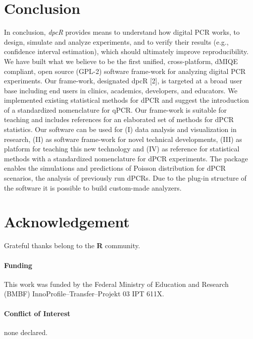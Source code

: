 \documentclass{bioinfo}
\begin{document}
%
%






\section{Conclusion}

In conclusion, \textit{dpcR} provides means to understand how digital PCR works, 
to design, simulate and analyze experiments, and to verify their results (e.g., 
confidence interval estimation), which should ultimately improve 
reproducibility. We have built what we believe to be the first unified, 
cross-platform, dMIQE compliant, open source (GPL-2) software frame-work for 
analyzing digital PCR experiments. Our frame-work, designated dpcR [2], is 
targeted at a broad user base including end users in clinics, academics, 
developers, and educators. We implemented existing statistical methods for dPCR 
and suggest the introduction of a standardized nomenclature for qPCR. Our 
frame-work is suitable for teaching and includes references for an elaborated 
set of methods for dPCR statistics. Our software can be used for (I) data 
analysis and visualization in research, (II) as software frame-work for novel 
technical developments, (III) as platform for teaching this new technology and 
(IV) as reference for statistical methods with a standardized nomenclature for 
dPCR experiments. The package enables the simulations and predictions of Poisson 
distribution for dPCR scenarios, the analysis of previously run dPCRs. Due to 
the plug-in structure of the software it is possible to build custom-made 
analyzers.

\section*{Acknowledgement}

Grateful thanks belong to the \textbf{R} community.

\paragraph{Funding\textcolon} This work was funded by the Federal Ministry of Education and Research (BMBF)
 InnoProfile--Transfer--Projekt 03 IPT 611X.

\paragraph{Conflict of Interest\textcolon} none declared.

%
%
%
%
%
%

%

\end{document}
